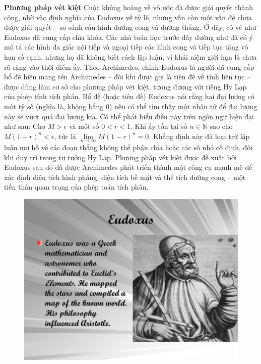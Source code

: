 \begin{multicols}{2}
	\vskip 0.1cm
	\textbf{\color{lichsutoanhoc}Phương pháp vét kiệt}
	\vskip 0.1cm
	Cuộc khủng hoảng về vô ước đã được giải quyết thành công, nhờ vào định nghĩa của Eudoxus về tỷ lệ, nhưng vẫn còn một vấn đề chưa được giải quyết -- so sánh cấu hình đường cong và đường thẳng. 
	\vskip 0.1cm
	Ở đây, có vẻ như Eudoxus đã cung cấp chìa khóa.
	\vskip 0.1cm
	Các nhà toán học trước đây dường như đã có ý mô tả các hình đa giác nội tiếp và ngoại tiếp các hình cong và tiếp tục tăng vô hạn số cạnh, nhưng họ đã không biết cách lập luận, vì khái niệm giới hạn là chưa rõ ràng vào thời điểm ấy. 
	\vskip 0.1cm
	Theo Archimedes, chính Eudoxus là người đã cung cấp bổ đề hiện mang tên Archimedes -- đôi khi được gọi là tiên đề về tính liên tục -- được dùng làm cơ sở cho phương pháp vét kiệt, tương đương với tiếng Hy Lạp của phép tính tích phân.
	\vskip 0.1cm
	Bổ đề (hoặc tiên đề) Eudoxus nói rằng hai đại lượng có một tỷ số (nghĩa là, không bằng $0$) nếu có thể tìm thấy một nhân tử để đại lượng này sẽ vượt quá đại lượng kia. Có thể phát biểu điều này trên ngôn ngữ hiện đại như sau: Cho $M > \epsilon$  và một số $0 < r < 1$. Khi ấy tồn tại số $n \in \mathbb{N}$  sao cho $M(1-r)^n < \epsilon$, tức là $\mathop {\lim }\limits_{n \to \infty } M{\left( {1 - r} \right)^n} = 0$. 
	\vskip 0.1cm
	Khẳng định này đã loại trừ lập luận mơ hồ về các đoạn thẳng không thể phân chia hoặc các số nhỏ cố định, đôi khi duy trì trong tư tưởng Hy Lạp. 
	\vskip 0.1cm
	Phương pháp vét kiệt được đề xuất bởi Eudoxus sau đó đã được Archimedes phát triển thành một công cụ mạnh mẽ để xác định diện tích hình phẳng, diện tích bề mặt và thể tích đường cong --  một tiền thân quan trọng của phép toán tích phân.
	\begin{figure}[H]
		\vspace*{-5pt}
		\centering
		\captionsetup{labelformat= empty, justification=centering}
		\includegraphics[width= 1\linewidth]{1}

\end{figure}
\end{multicols}

